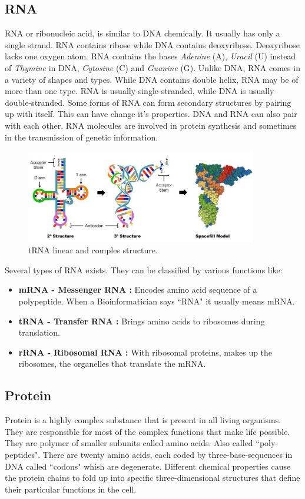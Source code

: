 \subsection{RNA}
RNA or ribonucleic acid, is similar to DNA chemically. It usually has only a single strand. RNA contains ribose while DNA contains deoxyribose. Deoxyribose lacks one oxygen atom. RNA contains the bases \textit{Adenine} (A), \textit{Uracil} (U) instead of \textit{Thymine} in DNA, \textit{Cytosine} (C) and \textit{Guanine} (G).
Unlike DNA, RNA comes in a variety of shapes and types. While DNA contains double helix, RNA may be of more than one type. RNA is usually single-stranded, while DNA is usually double-stranded. Some forms of RNA can form secondary structures by pairing up with itself. This can have change it's properties. DNA and RNA can also pair with each other. RNA molecules are involved in protein synthesis and sometimes in the transmission of genetic information.

\begin{figure}[!tb]
	\centering
	\includegraphics[width=0.9\textwidth]{figures/trna}
	\caption{tRNA linear and comples structure.}
	\label{fig:rna}
\end{figure}

Several types of RNA exists. They can be classified by various functions like:
\begin{itemize}
	\item \textbf{mRNA - Messenger RNA :} Encodes amino acid sequence of a polypeptide. When a Bioinformatician says ``RNA" it usually means mRNA.
	\item \textbf{tRNA - Transfer RNA :} Brings amino acids to ribosomes during translation.
	\item \textbf{rRNA - Ribosomal RNA :} With ribosomal proteins, makes up the ribosomes, the organelles that translate the mRNA.
\end{itemize}

\subsection{Protein}
Protein is a highly complex substance that is present in all living organisms. They are responsible for most of the complex functions that make life possible. They are polymer of smaller subunits called amino acids. Also called ``poly-peptides". There are twenty amino acids, each coded by three-base-sequences in DNA called ``codons" whish are degenerate. Different chemical properties cause the protein chains to fold up into specific three-dimensional structures that define their particular functions in the cell. 

